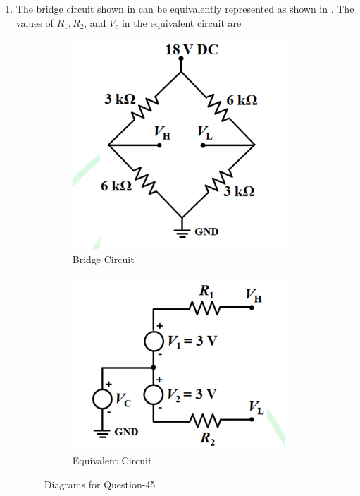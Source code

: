 \documentclass[journal,12pt,onecolumn]{IEEEtran}
\theoremstyle{remark}
\begin{document}
\begin{enumerate}
\item The bridge circuit shown in  can be equivalently represented as shown in . The values of $R_1, R_2$, and $V_c$ in the equivalent circuit are \par\hfill{}
\begin{figure}[H]
\centering
\begin{subfigure}{.5\columnwidth}
  \centering
  \includegraphics[width=.4\columnwidth]{Figs/Q-45(a).png}
  \caption{Bridge Circuit}
  \label{45(a)}
\end{subfigure}
\begin{subfigure}{.5\textwidth}
  \centering
  \includegraphics[width=.4\columnwidth]{Figs/Q-45(b).png}
  \caption{Equivalent Circuit}
  \label{45(b)}
\end{subfigure}
\caption{Diagrams for Question-45}
\label{45}
\end{figure}
\begin{enumerate}
\end{enumerate}



\end{enumerate}
\end{document}
